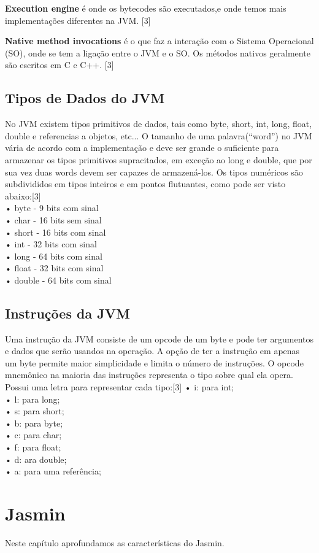 \documentclass[12pt,a4paper,twoside]{report}
\begin{document}
\textbf{Execution engine} é onde os bytecodes são executados,e onde temos mais implementações
diferentes na JVM. [3]

\textbf{Native method invocations} é  o que faz a interação com o Sistema Operacional (SO),
onde se tem a ligação entre o JVM e o SO. Os métodos nativos geralmente são
escritos em C e C++. [3]

\section{Tipos de Dados do JVM}
No JVM existem tipos primitivos de dados, tais como byte, short, int, long, float, double e
referencias a objetos, etc... O tamanho de uma palavra(“word”) no JVM vária de acordo com a
implementação e deve ser grande o suficiente para armazenar os tipos primitivos supracitados, em
exceção ao long e double, que por sua vez duas words devem ser capazes de armazená-los.
Os tipos numéricos são subdivididos em tipos inteiros e em pontos flutuantes, como pode ser
visto abaixo:[3]\\
• byte - 9 bits com sinal\\
• char - 16 bits sem sinal\\
• short - 16 bits com sinal\\
• int - 32 bits com sinal\\
• long - 64 bits com sinal\\
• float - 32 bits com sinal\\
• double - 64 bits com sinal\\
\section{Instruções da JVM}
Uma instrução da JVM consiste de um opcode de um byte e pode ter argumentos e dados
que serão usandos na operação. A opção de ter a instrução em apenas um byte permite maior
simplicidade e limita o número de instruções.
O opcode mnemônico na maioria das instruções representa o tipo sobre qual ela opera. Possui
uma letra para representar cada tipo:[3]
• i: para int;\\
• l: para long;\\
• s: para short;\\
• b: para byte;\\
• c: para char;\\
• f: para float;\\
• d: ara double;\\
• a: para uma referência;
\chapter{Jasmin}
Neste capítulo aprofundamos as características do Jasmin.
\end{document}
